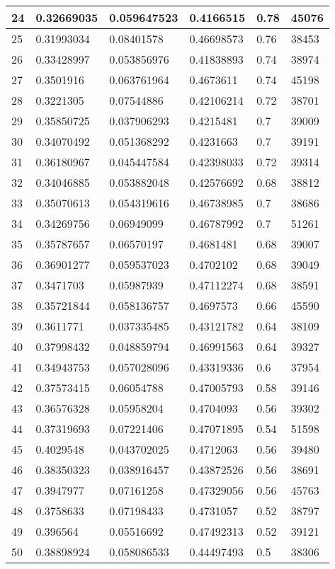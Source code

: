 \begin{longtable}{|l|l|l|l|l|l|}
24 & 0.32669035 & 0.059647523 & 0.4166515 & 0.78 & 45076 \\ \hline 
25 & 0.31993034 & 0.08401578 & 0.46698573 & 0.76 & 38453 \\ \hline 
26 & 0.33428997 & 0.053856976 & 0.41838893 & 0.74 & 38974 \\ \hline 
27 & 0.3501916 & 0.063761964 & 0.4673611 & 0.74 & 45198 \\ \hline 
28 & 0.3221305 & 0.07544886 & 0.42106214 & 0.72 & 38701 \\ \hline 
29 & 0.35850725 & 0.037906293 & 0.4215481 & 0.7 & 39009 \\ \hline 
30 & 0.34070492 & 0.051368292 & 0.4231663 & 0.7 & 39191 \\ \hline 
31 & 0.36180967 & 0.045447584 & 0.42398033 & 0.72 & 39314 \\ \hline 
32 & 0.34046885 & 0.053882048 & 0.42576692 & 0.68 & 38812 \\ \hline 
33 & 0.35070613 & 0.054319616 & 0.46738985 & 0.7 & 38686 \\ \hline 
34 & 0.34269756 & 0.06949099 & 0.46787992 & 0.7 & 51261 \\ \hline 
35 & 0.35787657 & 0.06570197 & 0.4681481 & 0.68 & 39007 \\ \hline 
36 & 0.36901277 & 0.059537023 & 0.4702102 & 0.68 & 39049 \\ \hline 
37 & 0.3471703 & 0.05987939 & 0.47112274 & 0.68 & 38591 \\ \hline 
38 & 0.35721844 & 0.058136757 & 0.4697573 & 0.66 & 45590 \\ \hline 
39 & 0.3611771 & 0.037335485 & 0.43121782 & 0.64 & 38109 \\ \hline 
40 & 0.37998432 & 0.048859794 & 0.46991563 & 0.64 & 39327 \\ \hline 
41 & 0.34943753 & 0.057028096 & 0.43319336 & 0.6 & 37954 \\ \hline 
42 & 0.37573415 & 0.06054788 & 0.47005793 & 0.58 & 39146 \\ \hline 
43 & 0.36576328 & 0.05958204 & 0.4704093 & 0.56 & 39302 \\ \hline 
44 & 0.37319693 & 0.07221406 & 0.47071895 & 0.54 & 51598 \\ \hline 
45 & 0.4029548 & 0.043702025 & 0.4712063 & 0.56 & 39480 \\ \hline 
46 & 0.38350323 & 0.038916457 & 0.43872526 & 0.56 & 38691 \\ \hline 
47 & 0.3947977 & 0.07161258 & 0.47329056 & 0.56 & 45763 \\ \hline 
48 & 0.3758633 & 0.07198433 & 0.4731057 & 0.52 & 38797 \\ \hline 
49 & 0.396564 & 0.05516692 & 0.47492313 & 0.52 & 39121 \\ \hline 
50 & 0.38898924 & 0.058086533 & 0.44497493 & 0.5 & 38306 \\ \hline 
\end{longtable}